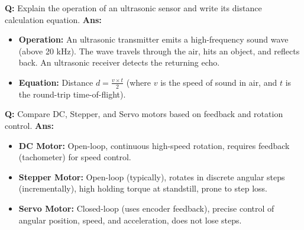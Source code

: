 \documentclass[10pt,a4paper,twocolumn]{article}
\begin{document}
\begin{tcolorbox}[
  colback=white,
  colframe=UnitColorOne,
  colbacktitle=gray!10!white,
  coltitle=black,
  fonttitle=\bfseries\sffamily\small,
  title={Unit I $\bullet$ Card 7: Ultrasonic Sensor Principle},
  boxrule=1.2pt,
  arc=2mm,
  outer arc=2mm,
  boxsep=1.5mm,
  top=1mm,
  bottom=1mm,
  left=1.5mm,
  right=1.5mm,
  before skip=2.5mm,
  after skip=2.5mm
]
\textbf{Q:} Explain the operation of an ultrasonic sensor and write its distance calculation equation.
\tcbline
\textbf{Ans:} \begin{itemize}
  \item   \textbf{Operation:} An ultrasonic transmitter emits a high-frequency sound wave (above 20 kHz). The wave travels through the air, hits an object, and reflects back. An ultrasonic receiver detects the returning echo.
  \item   \textbf{Equation:} Distance $d = \frac{v \times t}{2}$ (where $v$ is the speed of sound in air, and $t$ is the round-trip time-of-flight).
\end{itemize}
\end{tcolorbox}


\begin{tcolorbox}[
  colback=white,
  colframe=UnitColorOne,
  colbacktitle=gray!10!white,
  coltitle=black,
  fonttitle=\bfseries\sffamily\small,
  title={Unit I $\bullet$ Card 8: Motors Comparison},
  boxrule=1.2pt,
  arc=2mm,
  outer arc=2mm,
  boxsep=1.5mm,
  top=1mm,
  bottom=1mm,
  left=1.5mm,
  right=1.5mm,
  before skip=2.5mm,
  after skip=2.5mm
]
\textbf{Q:} Compare DC, Stepper, and Servo motors based on feedback and rotation control.
\tcbline
\textbf{Ans:} \begin{itemize}
  \item   \textbf{DC Motor:} Open-loop, continuous high-speed rotation, requires feedback (tachometer) for speed control.
  \item   \textbf{Stepper Motor:} Open-loop (typically), rotates in discrete angular steps (incrementally), high holding torque at standstill, prone to step loss.
  \item   \textbf{Servo Motor:} Closed-loop (uses encoder feedback), precise control of angular position, speed, and acceleration, does not lose steps.
\end{itemize}
\end{tcolorbox}
\end{document}
